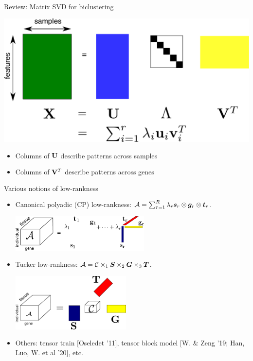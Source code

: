 \documentclass[10pt, mathserif]{beamer} %
\theoremstyle{definition}
\theoremstyle{plain}
\begin{document}
\begin{frame}[label=matrix]{Review: Matrix SVD for biclustering}
\vspace{.2cm}

\centerline{\includegraphics[width=.9\textwidth]{Figures/svd.pdf}}

\begin{itemize}
\item Columns of ${\bf U}$ describe patterns across samples
\item Columns of ${\bf V}^T$ describe patterns across genes
\end{itemize}


 
\end{frame}


\begin{frame}{Various notions of low-rankness}
\begin{itemize}
\item Canonical polyadic (CP) low-rankness: $\mathcal{A}=\sum_{r=1}^R\lambda_r\bm{s}_r\otimes \bm{g}_r\otimes \bm{t}_r$.

\vspace{.3cm}
\centerline{\includegraphics[width=7cm]{Figures/CP_decomp2.pdf}}

\item Tucker low-rankness: $\mathcal{A}=\mathcal{C}\times_1\bm S\times_2 \bm G\times_3\bm T$.

\vspace{.5cm}
\centerline{\includegraphics[width=6cm]{Figures/HOSVD.pdf}}
\item Others: tensor train {\scriptsize[Oseledet '11]}, tensor block model {\scriptsize[W. \& Zeng '19; Han, Luo, W. et al '20]}, etc.
\end{itemize}
\end{frame}
\end{document}
